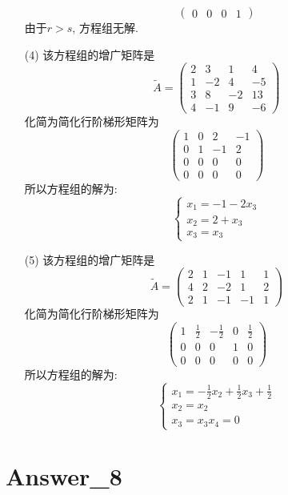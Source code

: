 \documentclass{article}
\begin{document}
\begin{itemize}
$$\begin{pmatrix}
        0 & 0 & 0 & 1
    \end{pmatrix}
    $$
    由于$r > s$, 方程组无解.
    \item[(4)]
    该方程组的增广矩阵是
    $$\tilde{A} = \begin{pmatrix}
        2 & 3 & 1 & 4 \\
        1 & -2 & 4 & -5 \\
        3 & 8 & -2 & 13 \\
        4 & -1 & 9 & -6
    \end{pmatrix}    
    $$
    化简为简化行阶梯形矩阵为
    $$
    \begin{pmatrix}
        1 & 0 & 2 & -1 \\
        0 & 1 & -1 & 2 \\
        0 & 0 & 0 & 0 \\
        0 & 0 & 0 & 0
    \end{pmatrix}
    $$
    所以方程组的解为:
    $$
    \begin{cases} 
        x_1 = -1 - 2x_3 \\
        x_2 = 2 + x_3 \\
        x_3 = x_3
    \end{cases}
    $$
    \item[(5)]
    该方程组的增广矩阵是
    $$\tilde{A} = \begin{pmatrix}
        2 & 1 & -1 & 1 & 1 \\
        4 & 2 & -2 & 1 & 2 \\
        2 & 1 & -1 & -1 & 1
    \end{pmatrix}    
    $$
    化简为简化行阶梯形矩阵为
    $$
    \begin{pmatrix}
        1 & \frac{1}{2} & -\frac{1}{2} & 0 & \frac{1}{2} \\
        0 & 0 & 0 & 1 & 0 \\
        0 & 0 & 0 & 0 & 0
    \end{pmatrix}
    $$
    所以方程组的解为:
    $$
    \begin{cases} 
        x_1 = -\frac{1}{2}x_2 + \frac{1}{2}x_3 + \frac{1}{2} \\
        x_2 = x_2 \\
        x_3 = x_3
        x_4 = 0
    \end{cases}
    $$
\end{itemize}

\section{Answer\_8}
\end{document}
